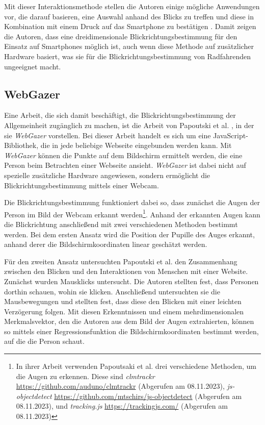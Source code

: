 Mit dieser Interaktionsmethode stellen die Autoren einige mögliche Anwendungen vor, die darauf basieren, eine Auswahl anhand des Blicks zu treffen und diese in Kombination mit einem Druck auf das Smartphone zu bestätigen \cite{paper:mobigaze}. Damit zeigen die Autoren, dass eine dreidimensionale Blickrichtungsbestimmung für den Einsatz auf Smartphones möglich ist, auch wenn diese Methode auf zusätzlicher Hardware basiert, was sie für die Blickrichtungsbestimmung von Radfahrenden ungeeignet macht. 

\subsection{WebGazer}\label{sec:related:webgazer}\label{sec:related:gaze:appearance:webgazer}

Eine Arbeit, die sich damit beschäftigt, die Blickrichtungsbestimmung der Allgemeinheit zugänglich zu machen, ist die Arbeit von Papoutski et al. \cite{paper:webgazer}, in der sie \textit{WebGazer} vorstellen. Bei dieser Arbeit handelt es sich um eine JavaScript-Bibliothek, die in jede beliebige Webseite eingebunden werden kann. Mit \textit{WebGazer} können die Punkte auf dem Bildschirm ermittelt werden, die eine Person beim Betrachten einer Webseite ansieht. \textit{WebGazer} ist dabei nicht auf spezielle zusätzliche Hardware angewiesen, sondern ermöglicht die Blickrichtungsbestimmung mittels einer Webcam. 

Die Blickrichtungsbestimmung funktioniert dabei so, dass zunächst die Augen der Person im Bild der Webcam erkannt werden\footnote{In ihrer Arbeit verwenden Papoutsaki et al. drei verschiedene Methoden, um die Augen zu erkennen. Diese sind \textit{clmtrackr} \url{https://github.com/auduno/clmtrackr} (Abgerufen am 08.11.2023), \textit{js-objectdetect} \url{https://github.com/mtschirs/js-objectdetect} (Abgerufen am 08.11.2023), und \textit{tracking.js} \url{https://trackingjs.com/} (Abgerufen am 08.11.2023)}. Anhand der erkannten Augen kann die Blickrichtung anschließend mit zwei verschiedenen Methoden bestimmt werden. Bei dem ersten Ansatz wird die Position der Pupille des Auges erkannt, anhand derer die Bildschirmkoordinaten linear geschätzt werden. 

Für den zweiten Ansatz untersuchten Papoutski et al. den Zusammenhang zwischen den Blicken und den Interaktionen von Menschen mit einer Website. Zunächst wurden Mausklicks untersucht. Die Autoren stellten fest, dass Personen dorthin schauen, wohin sie klicken. Anschließend untersuchten sie die Mausbewegungen und stellten fest, dass diese den Blicken mit einer leichten Verzögerung folgen. Mit diesen Erkenntnissen und einem mehrdimensionalen Merkmalsvektor, den die Autoren aus dem Bild der Augen extrahierten, können so mittels einer Regressionsfunktion die Bildschirmkoordinaten bestimmt werden, auf die die Person schaut. 

